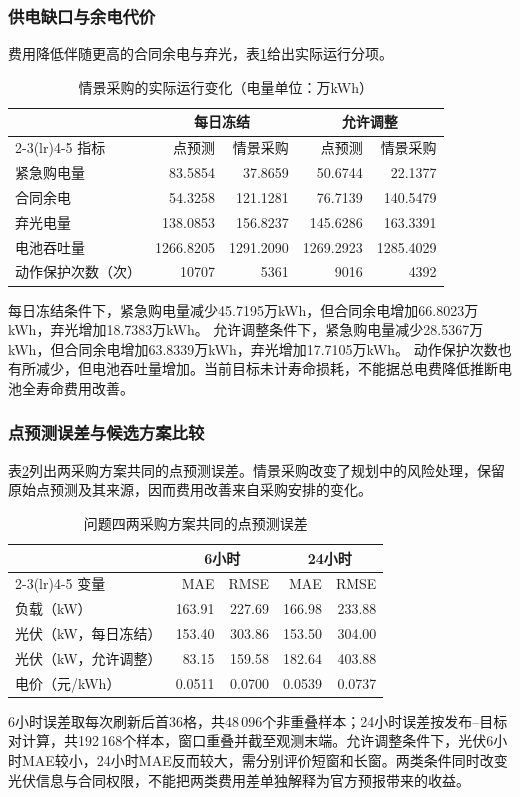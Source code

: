 \subsubsection{供电缺口与余电代价}
费用降低伴随更高的合同余电与弃光，表\ref{tab:q4-operation}给出实际运行分项。
\begin{table}[H]\centering\small
\caption{情景采购的实际运行变化（电量单位：万kWh）}\label{tab:q4-operation}
\begin{tabular}{lrrrr}\toprule
 & \multicolumn{2}{c}{每日冻结} & \multicolumn{2}{c}{允许调整} \\
\cmidrule(lr){2-3}\cmidrule(lr){4-5}
指标 & 点预测 & 情景采购 & 点预测 & 情景采购 \\ \midrule
紧急购电量 & 83.5854 & 37.8659 & 50.6744 & 22.1377 \\
合同余电 & 54.3258 & 121.1281 & 76.7139 & 140.5479 \\
弃光电量 & 138.0853 & 156.8237 & 145.6286 & 163.3391 \\
电池吞吐量 & 1266.8205 & 1291.2090 & 1269.2923 & 1285.4029 \\
动作保护次数（次） & 10707 & 5361 & 9016 & 4392 \\
\bottomrule\end{tabular}\end{table}

每日冻结条件下，紧急购电量减少45.7195万kWh，但合同余电增加66.8023万kWh，弃光增加18.7383万kWh。
允许调整条件下，紧急购电量减少28.5367万kWh，但合同余电增加63.8339万kWh，弃光增加17.7105万kWh。
动作保护次数也有所减少，但电池吞吐量增加。当前目标未计寿命损耗，不能据总电费降低推断电池全寿命费用改善。

\subsubsection{点预测误差与候选方案比较}
表\ref{tab:q4-prediction}列出两采购方案共同的点预测误差。情景采购改变了规划中的风险处理，保留原始点预测及其来源，因而费用改善来自采购安排的变化。
\begin{table}[H]\centering\small
\caption{问题四两采购方案共同的点预测误差}\label{tab:q4-prediction}
\begin{tabular}{lrrrr}\toprule
 & \multicolumn{2}{c}{6小时} & \multicolumn{2}{c}{24小时} \\
\cmidrule(lr){2-3}\cmidrule(lr){4-5}
变量 & MAE & RMSE & MAE & RMSE \\ \midrule
负载（kW） & 163.91 & 227.69 & 166.98 & 233.88 \\
光伏（kW，每日冻结） & 153.40 & 303.86 & 153.50 & 304.00 \\
光伏（kW，允许调整） & 83.15 & 159.58 & 182.64 & 403.88 \\
电价（元/kWh） & 0.0511 & 0.0700 & 0.0539 & 0.0737 \\
\bottomrule\end{tabular}\end{table}
6小时误差取每次刷新后首36格，共48\,096个非重叠样本；24小时误差按发布--目标对计算，共192\,168个样本，窗口重叠并截至观测末端。允许调整条件下，光伏6小时MAE较小，24小时MAE反而较大，需分别评价短窗和长窗。两类条件同时改变光伏信息与合同权限，不能把两类费用差单独解释为官方预报带来的收益。

